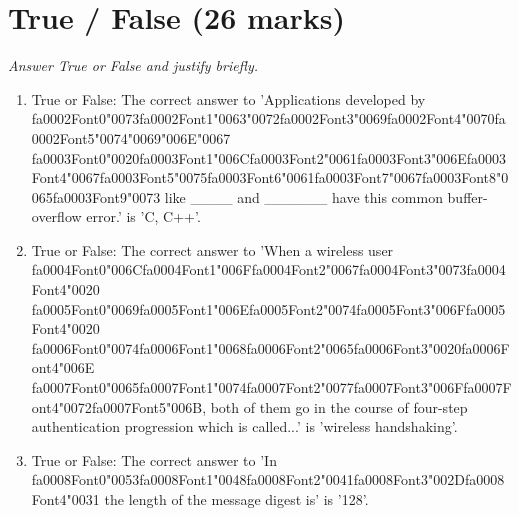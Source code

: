 \documentclass[12pt]{article}
\begin{document}
\section*{True / False (26 marks)}
\textit{Answer True or False and justify briefly.}
\begin{enumerate}[label=\arabic*.]
\item True or False: The correct answer to 'Applications developed by {\csname fa0002Font0\endcsname\char"0073}{\csname fa0002Font1\endcsname\char"0063}{\char"0072}{\csname fa0002Font3\endcsname\char"0069}{\csname fa0002Font4\endcsname\char"0070}{\csname fa0002Font5\endcsname\char"0074}{\char"0069}{\char"006E}{\char"0067} {\csname fa0003Font0\endcsname\char"0020}{\csname fa0003Font1\endcsname\char"006C}{\csname fa0003Font2\endcsname\char"0061}{\csname fa0003Font3\endcsname\char"006E}{\csname fa0003Font4\endcsname\char"0067}{\csname fa0003Font5\endcsname\char"0075}{\csname fa0003Font6\endcsname\char"0061}{\csname fa0003Font7\endcsname\char"0067}{\csname fa0003Font8\endcsname\char"0065}{\csname fa0003Font9\endcsname\char"0073} like \_\_\_\_ and \_\_\_\_\_\_ have this common buffer-overflow error.' is 'C, C++'.
\item True or False: The correct answer to 'When a wireless user {\csname fa0004Font0\endcsname\char"006C}{\csname fa0004Font1\endcsname\char"006F}{\csname fa0004Font2\endcsname\char"0067}{\csname fa0004Font3\endcsname\char"0073}{\csname fa0004Font4\endcsname\char"0020} {\csname fa0005Font0\endcsname\char"0069}{\csname fa0005Font1\endcsname\char"006E}{\csname fa0005Font2\endcsname\char"0074}{\csname fa0005Font3\endcsname\char"006F}{\csname fa0005Font4\endcsname\char"0020} {\csname fa0006Font0\endcsname\char"0074}{\csname fa0006Font1\endcsname\char"0068}{\csname fa0006Font2\endcsname\char"0065}{\csname fa0006Font3\endcsname\char"0020}{\csname fa0006Font4\endcsname\char"006E} {\csname fa0007Font0\endcsname\char"0065}{\csname fa0007Font1\endcsname\char"0074}{\csname fa0007Font2\endcsname\char"0077}{\csname fa0007Font3\endcsname\char"006F}{\csname fa0007Font4\endcsname\char"0072}{\csname fa0007Font5\endcsname\char"006B}, both of them go in the course of four-step authentication progression which is called...' is 'wireless handshaking'.
\item True or False: The correct answer to 'In {\csname fa0008Font0\endcsname\char"0053}{\csname fa0008Font1\endcsname\char"0048}{\csname fa0008Font2\endcsname\char"0041}{\csname fa0008Font3\endcsname\char"002D}{\csname fa0008Font4\endcsname\char"0031} the length of the message digest is' is '128'.

\end{enumerate}
\end{document}
